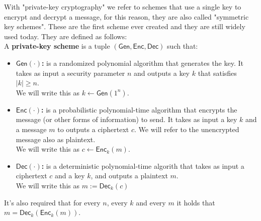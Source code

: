 With "private-key cryptography" we refer to schemes that use a single key to encrypt and decrypt a message, for this reason, they are also called "symmetric key schemes".
These are the first scheme ever created and they are still widely used today. They are defined as follows:\\
A \textbf{private-key scheme} is a tuple $(\mathsf{Gen}, \mathsf{Enc}, \mathsf{Dec})$ such that:
\begin{itemize}
    \item{\textbf{$\mathsf{Gen}(\cdot)$:} is a randomized polynomial algorithm that generates the key. It takes as input a security parameter $n$ and outputs a key $k$ that satisfies $|k| \geq n$.\\
        We will write this as $k \leftarrow \mathsf{Gen}(1^n)$.}
    \item{\textbf{$\mathsf{Enc}(\cdot)$:} is a probabilistic polynomial-time algorithm that encrypts the message (or other forms of information) to send. It takes as input a key $k$ and a message $m$ to outputs a ciphertext $c$. We will refer to the unencrypted message also as plaintext.\\
        We will write this as $c \leftarrow \mathsf{Enc}_k(m)$.}
    \item{\textbf{$\mathsf{Dec}(\cdot)$:} is a deterministic polynomial-time algorith that takes as input a ciphertext $c$ and a key $k$, and outputs a plaintext $m$.\\
        We will write this as $m := \mathsf{Dec}_k(c)$}
\end{itemize}
It's also required that for every $n$, every $k$ and every $m$ it holds that $m = \mathsf{Dec}_k(\mathsf{Enc}_k(m))$.\\


